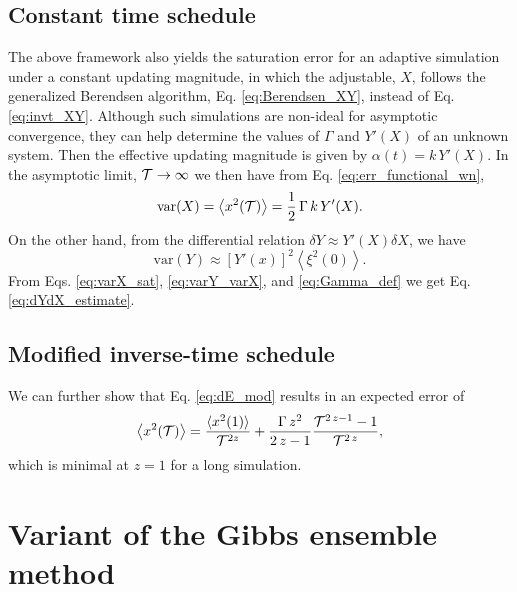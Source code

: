 \documentclass[reprint]{revtex4-1}
\begin{document}
\subsection{Constant time schedule}

The above framework also yields the saturation error
for an adaptive simulation under a constant updating magnitude,
in which the adjustable, $X$,
follows the generalized Berendsen algorithm,
Eq. \eqref{eq:Berendsen_XY},
instead of Eq. \eqref{eq:invt_XY}.
%
Although such simulations are non-ideal for asymptotic convergence,
they can help determine the values of $\Gamma$
and $Y'(X)$ of an unknown system.
%
Then the effective updating magnitude
is given by $\alpha(t) = k \, Y'(X)$.
%
In the asymptotic limit, $\mathcal T \to \infty$
we then have
from Eq. \eqref{eq:err_functional_wn},
%
\begin{equation}
  \mathrm{var}(X)
  =
  \left\langle x^2(\mathcal T) \right\rangle
  =
  \frac{1}{2} \, \Gamma \, k \, Y'(X)
  .
  \label{eq:varX_sat}
\end{equation}
%
On the other hand,
from the differential relation
$\delta Y \approx Y'(X) \delta X$,
we have
%
\begin{equation}
  \mathrm{var} (Y)
  \approx
  [Y'(x)]^2
  \left\langle
  \xi^2(0)
  \right\rangle
  .
  \label{eq:varY_varX}
\end{equation}
%
From Eqs. \eqref{eq:varX_sat}, \eqref{eq:varY_varX}, and \eqref{eq:Gamma_def}
we get Eq. \eqref{eq:dYdX_estimate}.


\subsection{Modified inverse-time schedule}

We can further show that Eq. \eqref{eq:dE_mod}
results in an expected error of
\begin{equation}
  \left\langle
  x^2(\mathcal T)
  \right\rangle
  =
  \frac{ \langle x^2(1) \rangle } { \mathcal T^{2z} }
  +
  \frac{ \Gamma \, z^2 } { 2 \, z - 1 }
  \frac{
    \mathcal T^{2 \, z - 1} - 1
  }
  {
    \mathcal T^{2 \, z}
  }
  ,
  \notag
\end{equation}
which is minimal at $z = 1$ for a long simulation.



\section{\label{sec:gibbs}
Variant of the Gibbs ensemble method
}
\end{document}

